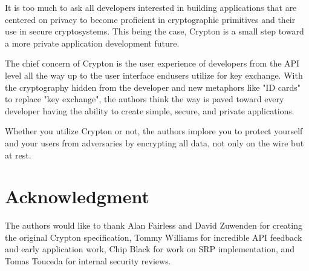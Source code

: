 \documentclass[conference]{IEEEtran}
\begin{document}
It is too much to ask all developers interested in building applications that are
centered on privacy to become proficient in cryptographic primitives and their
use in secure cryptosystems. This being the case, Crypton is a small step
toward a more private application development future.

The chief concern of Crypton is the user experience of developers from the API level
all the way up to the user interface endusers utilize for key exchange. With the
cryptography hidden from the developer and new metaphors like "ID cards" to replace
"key exchange", the authors think the way is paved toward every developer having
the ability to create simple, secure, and private applications.

Whether you utilize Crypton or not, the authors implore you to protect yourself
and your users from adversaries by encrypting all data, not only on the wire but
at rest.

\section*{Acknowledgment}
The authors would like to thank Alan Fairless and David Zuwenden for creating the
original Crypton specification, Tommy Williams for incredible API feedback and
early application work, Chip Black for work on SRP implementation, and Tomas
Touceda for internal security reviews.
\end{document}
